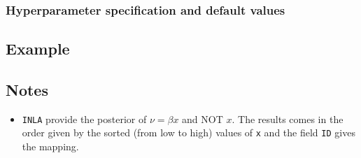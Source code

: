\documentclass[a4paper,11pt]{article}
\begin{document}
\subsubsection*{Hyperparameter specification and default values}


\subsection*{Example}



\subsection*{Notes}

\begin{itemize}
\item \texttt{INLA} provide the posterior of $\nu=\beta x$ and
    NOT $x$.  The results comes in the order given by the
    sorted (from low to high) values of \texttt{x} and the field
    \texttt{ID} gives the mapping.
\end{itemize}
\end{document}
